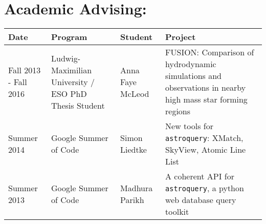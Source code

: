 \setlength{\extrarowheight}{4pt}
\section*{Academic Advising: }
\vspace{-12pt}
\begin{tabular}{p{0.75in}p{1.2in}lp{2.6in}}
    Date  & Program & Student &  Project \\
    \hline
    Fall 2013 - Fall 2016 & Ludwig-Maximilian University / ESO PhD Thesis Student & Anna Faye McLeod &  FUSION: Comparison of hydrodynamic simulations and observations in nearby high mass star forming regions  \\
    Summer 2014 & Google Summer of Code &                                                 Simon Liedtke    &  New tools for \texttt{astroquery}: XMatch, SkyView, Atomic Line List \\
    Summer 2013 & Google Summer of Code &                                                 Madhura Parikh   &  A coherent API for \texttt{astroquery}, a python web database query toolkit \\
\end{tabular}

